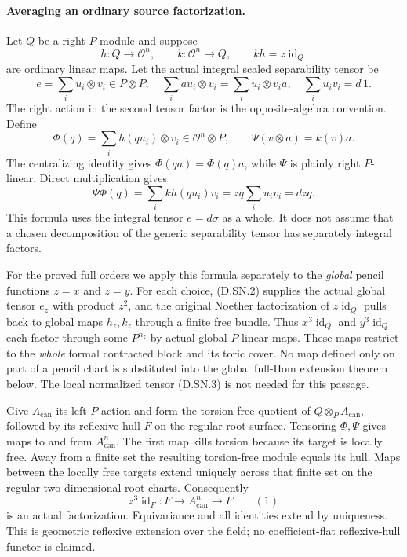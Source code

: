 \paragraph{Averaging an ordinary source factorization.}
Let $Q$ be a right $P$-module and suppose
\[
 h:Q\longrightarrow\mathcal O^n,\qquad
 k:\mathcal O^n\longrightarrow Q,\qquad kh=z\operatorname{id}_Q
\]
are ordinary linear maps. Let the actual integral scaled separability
tensor be
\[
 e=\sum_i u_i\otimes v_i\in P\otimes P,
 \quad \sum_i a u_i\otimes v_i=\sum_i u_i\otimes v_i a,
 \quad \sum_i u_iv_i=d\,1.
\]
The right action in the second tensor factor is the opposite-algebra
convention. Define
\[
 \Phi(q)=\sum_i h(q u_i)\otimes v_i\in\mathcal O^n\otimes P,
 \qquad \Psi(v\otimes a)=k(v)a.
\]
The centralizing identity gives $\Phi(qa)=\Phi(q)a$, while $\Psi$ is
plainly right $P$-linear. Direct multiplication gives
\[
 \Psi\Phi(q)=\sum_i kh(q u_i)v_i
            =zq\sum_i u_iv_i=dzq.
\]
This formula uses the integral tensor $e=d\sigma$ as a whole. It does
not assume that a chosen decomposition of the generic separability
tensor has separately integral factors.

For the proved full orders we apply this formula separately to the
\emph{global} pencil functions $z=x$ and $z=y$. For each choice,
(D.SN.2) supplies the actual global tensor $e_z$ with product $z^2$,
and the original Noether factorization of $z\operatorname{id}_Q$
pulls back to global maps $h_z,k_z$ through a finite free bundle.
Thus $x^3\operatorname{id}_Q$ and $y^3\operatorname{id}_Q$ each factor
through some $P^{n_z}$ by actual global $P$-linear maps. These maps
restrict to the \emph{whole} formal contracted block and its toric
cover. No map defined only on part of a pencil chart is substituted
into the global full-Hom extension theorem below. The local normalized
tensor (D.SN.3) is not needed for this passage.

Give $A_{\mathrm{can}}$ its left $P$-action and form the torsion-free
quotient of $Q\otimes_P A_{\mathrm{can}}$, followed by its reflexive
hull $F$ on the regular root surface. Tensoring $\Phi,\Psi$ gives
maps to and from $A_{\mathrm{can}}^n$. The first map kills torsion
because its target is locally free. Away from a finite set the
resulting torsion-free module equals its hull. Maps between the
locally free targets extend uniquely across that finite set on the
regular two-dimensional root charts. Consequently
\[
        z^3\operatorname{id}_F:
          F\longrightarrow A_{\mathrm{can}}^n\longrightarrow F
                                                               \qquad(1)
\]
is an actual factorization. Equivariance and all identities extend
by uniqueness. This is geometric reflexive extension over the field;
no coefficient-flat reflexive-hull functor is claimed.

